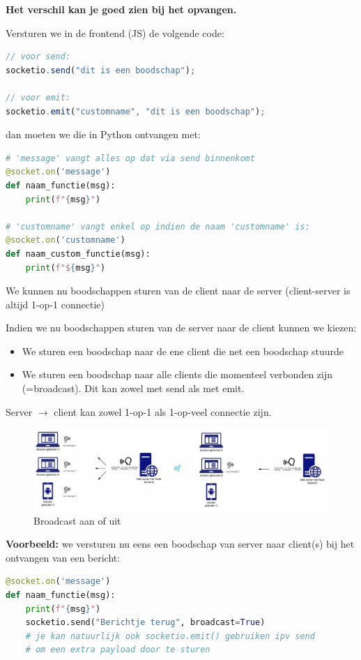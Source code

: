 \documentclass{article}
\newcommand{\bold}[1]{\textbf{#1}}
\begin{document}
\bold{Het verschil kan je goed zien bij het opvangen.}

Versturen we in de frontend (JS) de volgende code:
\begin{lstlisting}[language=Javascript]
// voor send:
socketio.send("dit is een boodschap");

// voor emit:
socketio.emit("customname", "dit is een boodschap");
\end{lstlisting}

dan moeten we die in Python ontvangen met:
\begin{lstlisting}[language=Python]
# 'message' vangt alles op dat via send binnenkomt
@socket.on('message')
def naam_functie(msg):
    print(f"{msg}")

# 'customname' vangt enkel op indien de naam 'customname' is:
@socket.on('customname')
def naam_custom_functie(msg):
    print(f"${msg}")
\end{lstlisting}


We kunnen nu boodschappen sturen van de client naar de server (client-server is altijd 1-op-1 connectie)

Indien we nu boodschappen sturen van de server naar de client kunnen we kiezen:
\begin{itemize}
    \item We sturen een boodschap naar de ene client die net een boodschap stuurde
    \item We sturen een boodschap naar alle clients die momenteel verbonden zijn (=broadcast). Dit kan zowel met send als met emit.
\end{itemize}

Server $\rightarrow$ client kan zowel 1-op-1 als 1-op-veel connectie zijn.

\begin{figure}[H]
    \centering
    \includegraphics[width=\textwidth]{img/Screenshot_20200420_091635.png} 
    \caption{Broadcast aan of uit}   
\end{figure}

\bold{Voorbeeld:} we versturen nu eens een boodschap van server naar client(s) bij het ontvangen van een bericht:
\begin{lstlisting}[language=Python]
@socket.on('message')
def naam_functie(msg):
    print(f"{msg}")
    socketio.send("Berichtje terug", broadcast=True)
    # je kan natuurlijk ook socketio.emit() gebruiken ipv send
    # om een extra payload door te sturen
\end{lstlisting}
\end{document}

